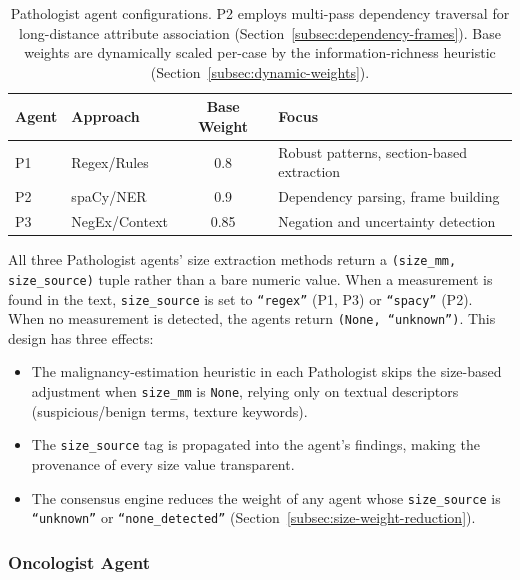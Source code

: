 \documentclass[12pt]{article}
\begin{document}
\begin{table}[ht]
\centering
\begin{tabular}{llcl}
\toprule
\textbf{Agent} & \textbf{Approach} & \textbf{Base Weight} & \textbf{Focus} \\
\midrule
P1 & Regex/Rules  & 0.8 & Robust patterns, section-based extraction \\
P2 & spaCy/NER    & 0.9 & Dependency parsing, frame building \\
P3 & NegEx/Context & 0.85 & Negation and uncertainty detection \\
\bottomrule
\end{tabular}
\caption{Pathologist agent configurations. P2 employs multi-pass dependency traversal for long-distance attribute association (Section~\ref{subsec:dependency-frames}). Base weights are dynamically scaled per-case by the information-richness heuristic (Section~\ref{subsec:dynamic-weights}).}
\label{tab:pathologists}
\end{table}

All three Pathologist agents' size extraction methods return a \texttt{(size\_mm, size\_source)} tuple rather than a bare numeric value. When a measurement is found in the text, \texttt{size\_source} is set to \texttt{``regex''} (P1, P3) or \texttt{``spacy''} (P2). When no measurement is detected, the agents return \texttt{(None, ``unknown'')}. This design has three effects:
\begin{itemize}
    \item The malignancy-estimation heuristic in each Pathologist skips the size-based adjustment when \texttt{size\_mm} is \texttt{None}, relying only on textual descriptors (suspicious/benign terms, texture keywords).
    \item The \texttt{size\_source} tag is propagated into the agent's findings, making the provenance of every size value transparent.
    \item The consensus engine reduces the weight of any agent whose \texttt{size\_source} is \texttt{``unknown''} or \texttt{``none\_detected''} (Section~\ref{subsec:size-weight-reduction}).
\end{itemize}

\subsubsection{Oncologist Agent}
\label{subsubsec:oncologist}
\end{document}
